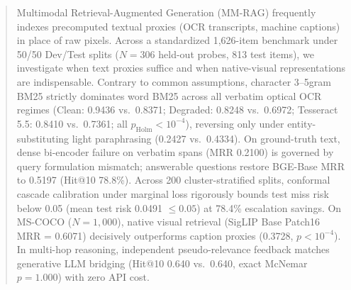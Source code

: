 \begin{abstract}
Multimodal Retrieval-Augmented Generation (MM-RAG) frequently indexes precomputed textual proxies (OCR transcripts, machine captions) in place of raw pixels. Across a standardized 1,626-item benchmark under 50/50 Dev/Test splits ($N=306$ held-out probes, 813 test items), we investigate when text proxies suffice and when native-visual representations are indispensable. Contrary to common assumptions, character 3--5gram BM25 strictly dominates word BM25 across all verbatim optical OCR regimes (Clean: 0.9436 vs.\ 0.8371; Degraded: 0.8248 vs.\ 0.6972; Tesseract 5.5: 0.8410 vs.\ 0.7361; all $p_{\text{Holm}} < 10^{-4}$), reversing only under entity-substituting light paraphrasing (0.2427 vs.\ 0.4334). On ground-truth text, dense bi-encoder failure on verbatim spans (MRR 0.2100) is governed by query formulation mismatch; answerable questions restore BGE-Base MRR to 0.5197 (Hit@10 78.8\%). Across 200 cluster-stratified splits, conformal cascade calibration under marginal loss rigorously bounds test miss risk below 0.05 (mean test risk 0.0491 $\le 0.05$) at 78.4\% escalation savings. On MS-COCO ($N=1{,}000$), native visual retrieval (SigLIP Base Patch16 MRR = 0.6071) decisively outperforms caption proxies (0.3728, $p < 10^{-4}$). In multi-hop reasoning, independent pseudo-relevance feedback matches generative LLM bridging (Hit@10 0.640 vs.\ 0.640, exact McNemar $p = 1.000$) with zero API cost.
\end{abstract}
